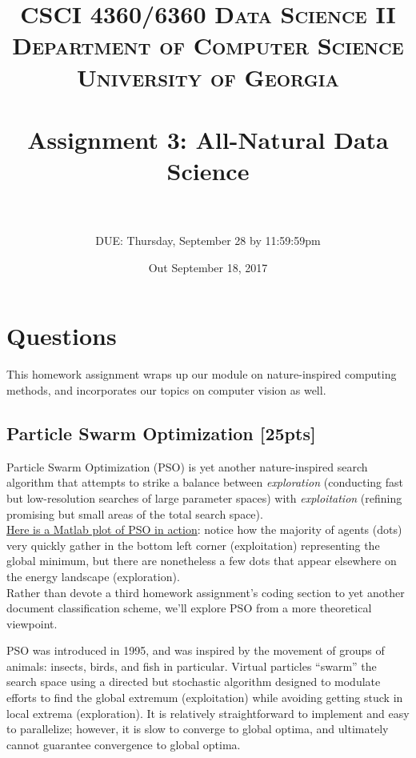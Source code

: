 \documentclass[paper=a4, fontsize=11pt]{scrartcl} %
\title{
\normalfont \normalsize
\textsc{CSCI 4360/6360 Data Science II} \\
\textsc{Department of Computer Science} \\
\textsc{University of Georgia} \\ [15pt] %
\horrule{0.5pt} \\[0.3cm] %
\huge Assignment 3: All-Natural Data Science \\ %
\horrule{2pt} \\[0.4cm] %
}
\author{DUE: Thursday, September 28 by 11:59:59pm} %
\date{\normalsize Out September 18, 2017}
\numberwithin{figure}{section} %
\numberwithin{table}{section} %
\begin{document}
\maketitle %


\section*{Questions}

This homework assignment wraps up our module on nature-inspired computing methods, and incorporates our topics on computer vision as well.

\setcounter{subsection}{0}

\subsection{Particle Swarm Optimization \textbf{[25pts]}}

Particle Swarm Optimization (PSO) is yet another nature-inspired search algorithm that attempts to strike a balance between \emph{exploration} (conducting fast but low-resolution searches of large parameter spaces) with \emph{exploitation} (refining promising but small areas of the total search space). \\

\href{https://www.youtube.com/watch?v=lX5qJimYusQ}{Here is a Matlab plot of PSO in action}: notice how the majority of agents (dots) very quickly gather in the bottom left corner (exploitation) representing the global minimum, but there are nonetheless a few dots that appear elsewhere on the energy landscape (exploration). \\

Rather than devote a third homework assignment's coding section to yet another document classification scheme, we'll explore PSO from a more theoretical viewpoint.

PSO was introduced in 1995, and was inspired by the movement of groups of animals: insects, birds, and fish in particular. Virtual particles ``swarm'' the search space using a directed but stochastic algorithm designed to modulate efforts to find the global extremum (exploitation) while avoiding getting stuck in local extrema (exploration). It is relatively straightforward to implement and easy to parallelize; however, it is slow to converge to global optima, and ultimately cannot guarantee convergence to global optima. \\
\end{document}
